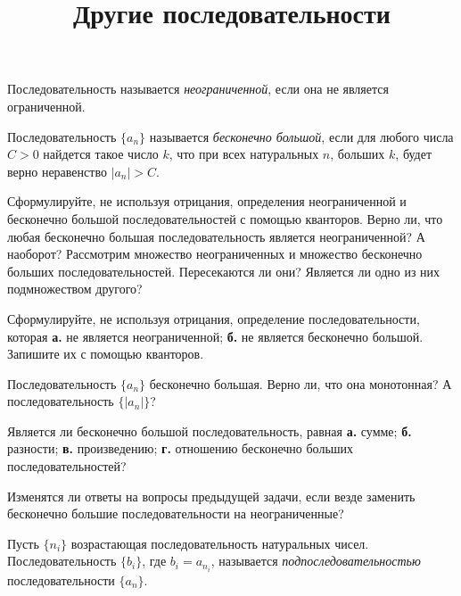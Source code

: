\documentclass[a4paper, 12pt, num=25]{listok}
\begin{document}
\title{Другие последовательности}
\maketitle{}
\begin{definition}
	Последовательность называется \textit{неограниченной}, если она не является ограниченной.
\end{definition}
\begin{definition}
	Последовательность $\{a_n\}$ называется \textit{бесконечно большой}, если для любого числа $C > 0$ найдется такое число $k$,
	что при всех натуральных $n$, больших $k$, будет верно неравенство $|a_n| > C$.
\end{definition}
\begin{problem}
	Сформулируйте, не используя отрицания, определения неограниченной и бесконечно большой последовательностей с помощью кванторов.
	Верно ли, что любая бесконечно большая последовательность является неограниченной? А наоборот?
	Рассмотрим множество неограниченных и множество бесконечно больших последовательностей. Пересекаются ли они?
	Является ли одно из них подмножеством другого?
\end{problem}
\begin{problem}
	Сформулируйте, не используя отрицания, определение последовательности, которая
	\textbf{а.} не является неограниченной; \textbf{б.} не является бесконечно большой.
	Запишите их с помощью кванторов.
\end{problem}
\begin{problem}
	Последовательность $\{a_n\}$ бесконечно большая. Верно ли, что она монотонная?
	А последовательность $\{|a_n|\}$?
\end{problem}
\begin{problem}
	Является ли бесконечно большой последовательность, равная \textbf{а.} сумме; \textbf{б.} разности;
	\textbf{в.} произведению; \textbf{г.} отношению бесконечно больших последовательностей?
\end{problem}
\begin{problem}
	Изменятся ли ответы на вопросы предыдущей задачи, если везде заменить бесконечно большие последовательности на неограниченные?
\end{problem}
\begin{definition}
	Пусть $\{n_i\}$  возрастающая последовательность натуральных чисел.
	Последовательность $\{b_i\}$, где $b_i = a_{n_i}$, называется \textit{подпоследовательностью} последовательности $\{a_n\}$.
\end{definition}
\end{document}
